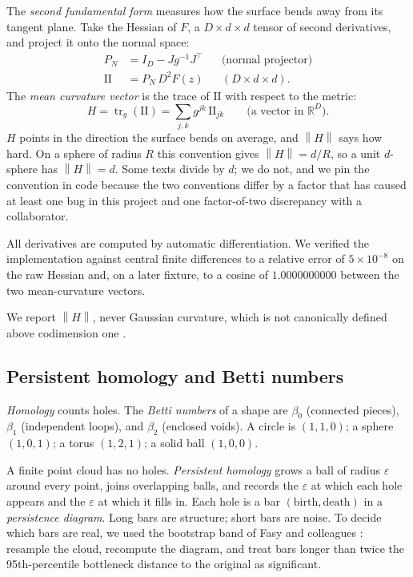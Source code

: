 \documentclass[11pt,a4paper]{article}
\newcommand{\norm}[1]{\left\lVert #1 \right\rVert}
\begin{document}
The \emph{second fundamental form} measures how the surface bends away from its tangent plane. Take the Hessian of $F$, a $D \times d \times d$ tensor of second derivatives, and project it onto the normal space:
\begin{align}
P_N &= I_D - J g^{-1} J^{\top} && \text{(normal projector)} \\
\mathrm{II} &= P_N \, D^2 F(z) && (D \times d \times d).
\end{align}
The \emph{mean curvature vector} is the trace of $\mathrm{II}$ with respect to the metric:
\begin{equation}
H = \operatorname{tr}_g(\mathrm{II}) = \sum_{j,k} g^{jk}\, \mathrm{II}_{jk} \qquad \text{(a vector in } \mathbb{R}^D).
\end{equation}
$H$ points in the direction the surface bends on average, and $\norm{H}$ says how hard. On a sphere of radius $R$ this convention gives $\norm{H} = d / R$, so a unit $d$-sphere has $\norm{H} = d$. Some texts divide by $d$; we do not, and we pin the convention in code because the two conventions differ by a factor that has caused at least one bug in this project and one factor-of-two discrepancy with a collaborator.

All derivatives are computed by automatic differentiation. We verified the implementation against central finite differences to a relative error of $5\times10^{-8}$ on the raw Hessian and, on a later fixture, to a cosine of $1.0000000000$ between the two mean-curvature vectors.

We report $\norm{H}$, never Gaussian curvature, which is not canonically defined above codimension one \citep{arxiv1312.2554}.

\subsection{Persistent homology and Betti numbers}
\label{sec:ph}

\emph{Homology} counts holes. The \emph{Betti numbers} of a shape are $\beta_0$ (connected pieces), $\beta_1$ (independent loops), and $\beta_2$ (enclosed voids). A circle is $(1,1,0)$; a sphere $(1,0,1)$; a torus $(1,2,1)$; a solid ball $(1,0,0)$.

A finite point cloud has no holes. \emph{Persistent homology} grows a ball of radius $\varepsilon$ around every point, joins overlapping balls, and records the $\varepsilon$ at which each hole appears and the $\varepsilon$ at which it fills in. Each hole is a bar $(\text{birth}, \text{death})$ in a \emph{persistence diagram}. Long bars are structure; short bars are noise. To decide which bars are real, we used the bootstrap band of Fasy and colleagues \citep{fasy2014confidence}: resample the cloud, recompute the diagram, and treat bars longer than twice the 95th-percentile bottleneck distance to the original as significant.
\end{document}
